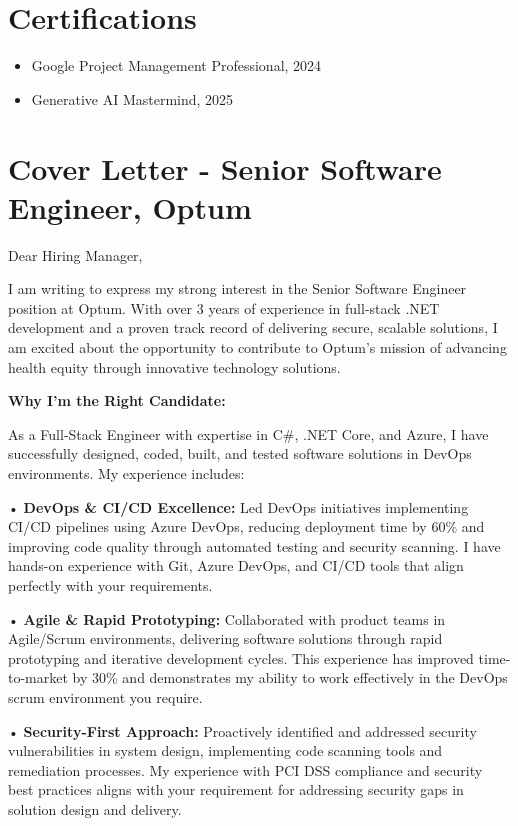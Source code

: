 \documentclass[letterpaper,10pt]{article}
\begin{document}
\section{Certifications}
\begin{itemize}
    \item Google Project Management Professional, 2024
    \item Generative AI Mastermind, 2025
\end{itemize}

\section{Cover Letter - Senior Software Engineer, Optum}

Dear Hiring Manager,

I am writing to express my strong interest in the Senior Software Engineer position at Optum. With over 3 years of experience in full-stack .NET development and a proven track record of delivering secure, scalable solutions, I am excited about the opportunity to contribute to Optum's mission of advancing health equity through innovative technology solutions.

\textbf{Why I'm the Right Candidate:}

As a Full-Stack Engineer with expertise in C\#, .NET Core, and Azure, I have successfully designed, coded, built, and tested software solutions in DevOps environments. My experience includes:

• \textbf{DevOps \& CI/CD Excellence:} Led DevOps initiatives implementing CI/CD pipelines using Azure DevOps, reducing deployment time by 60\% and improving code quality through automated testing and security scanning. I have hands-on experience with Git, Azure DevOps, and CI/CD tools that align perfectly with your requirements.

• \textbf{Agile \& Rapid Prototyping:} Collaborated with product teams in Agile/Scrum environments, delivering software solutions through rapid prototyping and iterative development cycles. This experience has improved time-to-market by 30\% and demonstrates my ability to work effectively in the DevOps scrum environment you require.

• \textbf{Security-First Approach:} Proactively identified and addressed security vulnerabilities in system design, implementing code scanning tools and remediation processes. My experience with PCI DSS compliance and security best practices aligns with your requirement for addressing security gaps in solution design and delivery.
\end{document}
